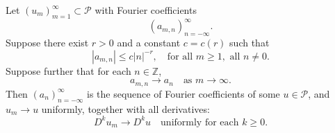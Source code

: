 Let $(u_m)_{m=1}^{\infty} \subset \mathcal{P}$ with Fourier coefficients
$$(a_{m,n})_{n=-\infty}^{\infty}.$$
Suppose there exist $r > 0$ and a constant $c = c(r)$ such that
$$|a_{m,n}| \leq c|n|^{-r}, \quad \text{for all } m \geq 1, \text{ all } n \neq 0.$$
Suppose further that for each $n \in \mathbb{Z}$,
$$a_{m,n} \to a_n \quad \text{as } m \to \infty.$$
Then $(a_n)_{n=-\infty}^{\infty}$ is the sequence of Fourier coefficients of some $u \in \mathcal{P}$,
and $u_m \to u$ uniformly, together with all derivatives:
$$D^k u_m \to D^k u \quad \text{uniformly for each } k \geq 0.$$

